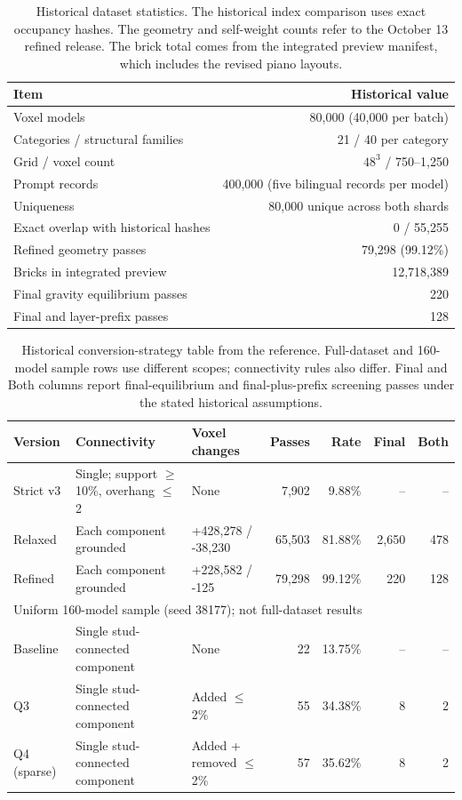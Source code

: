 \begin{table}[!htbp]\centering\small
\begin{tabular}{lr}\toprule
Item & Historical value \\ \midrule
Voxel models & 80,000 (40,000 per batch) \\
Categories / structural families & 21 / 40 per category \\
Grid / voxel count & $48^3$ / 750--1,250 \\
Prompt records & 400,000 (five bilingual records per model) \\
Uniqueness & 80,000 unique across both shards \\
Exact overlap with historical hashes & 0 / 55,255 \\
Refined geometry passes & 79,298 (99.12\%) \\
Bricks in integrated preview & 12,718,389 \\
Final gravity equilibrium passes & 220 \\
Final and layer-prefix passes & 128 \\
\bottomrule\end{tabular}
\caption{Historical dataset statistics. The historical index comparison uses exact occupancy hashes. The geometry and self-weight counts refer to the October 13 refined release. The brick total comes from the integrated preview manifest, which includes the revised piano layouts.}
\end{table}

\begin{table}[!htbp]\centering\small
\setlength{\tabcolsep}{3pt}
\begin{tabular}{@{}l>{\raggedright\arraybackslash}p{3.9cm}>{\raggedright\arraybackslash}p{2.5cm}rrrr@{}}\toprule
Version & Connectivity & Voxel changes & Passes & Rate & Final & Both \\ \midrule
Strict v3 & Single; support $\geq$10\%, overhang $\leq$2 & None & 7,902 & 9.88\% & -- & -- \\
Relaxed & Each component grounded & +428,278 / -38,230 & 65,503 & 81.88\% & 2,650 & 478 \\
Refined & Each component grounded & +228,582 / -125 & 79,298 & 99.12\% & 220 & 128 \\
\midrule
\multicolumn{7}{l}{Uniform 160-model sample (seed 38177); not full-dataset results} \\
Baseline & Single stud-connected component & None & 22 & 13.75\% & -- & -- \\
Q3 & Single stud-connected component & Added $\leq$2\% & 55 & 34.38\% & 8 & 2 \\
Q4 (sparse) & Single stud-connected component & Added + removed $\leq$2\% & 57 & 35.62\% & 8 & 2 \\
\bottomrule\end{tabular}
\caption{Historical conversion-strategy table from the reference. Full-dataset and 160-model sample rows use different scopes; connectivity rules also differ. Final and Both columns report final-equilibrium and final-plus-prefix screening passes under the stated historical assumptions.}
\end{table}

